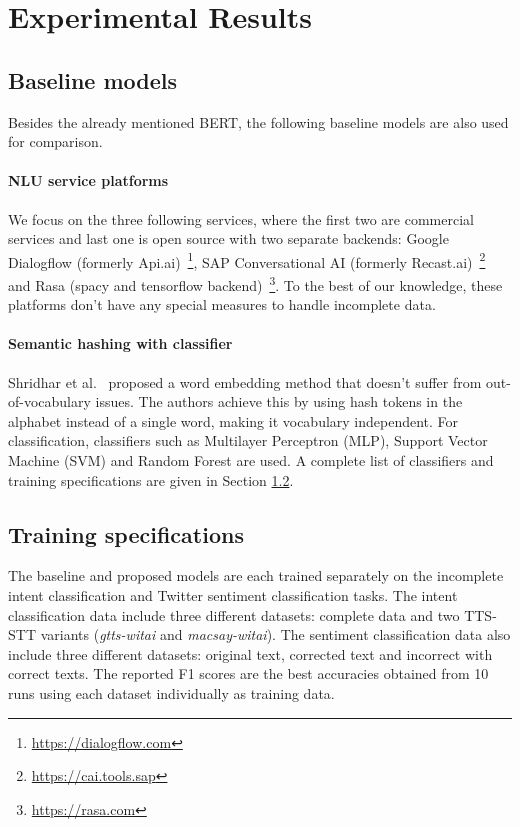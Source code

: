 \documentclass[review]{elsarticle}
\begin{document}
\section{Experimental Results}
\label{sec:experiments}

\subsection{Baseline models}
Besides the already mentioned BERT, the following baseline models are also used for comparison.

\paragraph{NLU service platforms} We focus on the three following services, where the first two are commercial services and last one is open source with two separate backends: Google Dialogflow (formerly Api.ai)~\footnote{\url{https://dialogflow.com}}, SAP Conversational AI (formerly Recast.ai)~\footnote{\url{https://cai.tools.sap}} and Rasa (spacy and tensorflow backend)~\footnote{\url{https://rasa.com}}. To the best of our knowledge, these platforms don't have any special measures to handle incomplete data.

\paragraph{Semantic hashing with classifier} Shridhar et al.~\cite{shridhar2018subword} proposed a word embedding method that doesn't suffer from out-of-vocabulary issues. The authors achieve this by using hash tokens in the alphabet instead of a single word, making it vocabulary independent. For classification, classifiers such as Multilayer Perceptron (MLP), Support Vector Machine (SVM) and Random Forest are used. A complete list of classifiers and training specifications are given in Section \ref{sec:training_specs}.

\subsection{Training specifications}
\label{sec:training_specs}
The baseline and proposed models are each trained separately on the incomplete intent classification and Twitter sentiment classification tasks. The intent classification data include three different datasets: complete data and two TTS-STT variants (\textit{gtts-witai} and \textit{macsay-witai}). The sentiment classification data also include three different datasets: original text, corrected text and incorrect with correct texts. The reported F1 scores are the best accuracies obtained from 10 runs using each dataset individually as training data.
\end{document}
